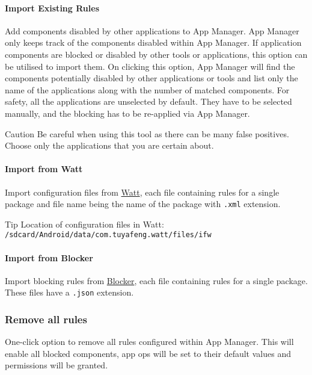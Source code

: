 \paragraph{Import Existing Rules}\label{par:import-existing-rules}
Add components disabled by other applications to App Manager. App Manager only keeps track of the components disabled within App Manager.
If application components are blocked or disabled by other tools or applications, this option can be utilised to import them.
On clicking this option, App Manager will find the components potentially disabled by other applications or tools and list only the name of the applications along with the number of matched components.
For safety, all the applications are unselected by default. They have to be selected manually, and the blocking has to be re-applied via App Manager.

\begin{danger}{Caution}
    Be careful when using this tool as there can be many false positives.
    Choose only the applications that you are certain about.
\end{danger}

\paragraph{Import from Watt} Import configuration files from \href{https://github.com/tuyafeng/Watt}{Watt}, each file
containing rules for a single package and file name being the name of the package with \texttt{.xml} extension.

\begin{tip}{Tip}
    Location of configuration files in Watt: \texttt{/sdcard/Android/data/com.tuyafeng.watt/files/ifw}
\end{tip}

\paragraph{Import from Blocker} Import blocking rules from \href{https://github.com/lihenggui/blocker}{Blocker}, each file containing rules for a single package.
These files have a \texttt{.json} extension.

\subsubsection{Remove all rules} %
One-click option to remove all rules configured within App Manager.
This will enable all blocked components, app ops will be set to their default values and permissions will be granted.


